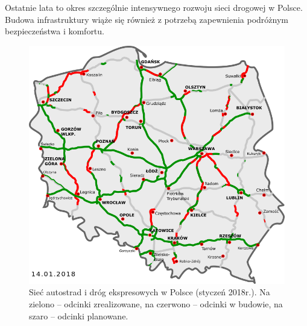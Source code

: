 Ostatnie lata to okres szczególnie intensywnego rozwoju sieci drogowej w Polsce. Budowa infrastruktury wiąże się również z potrzebą zapewnienia podróżnym bezpieczeństwa i komfortu.
\begin{figure}[h]
\caption{Sieć autostrad i dróg ekspresowych w Polsce (styczeń 2018r.). Na zielono -- odcinki zrealizowane, na czerwono -- odcinki w budowie, na szaro -- odcinki planowane.}
\includegraphics[width=\textwidth]{images/2018.png}
\end{figure}

